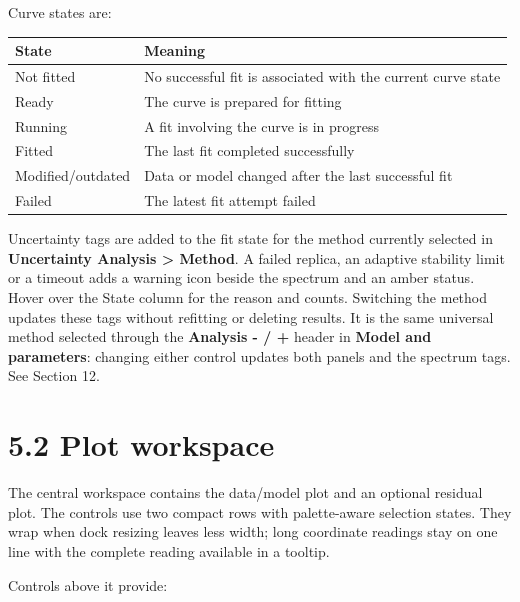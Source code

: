 \documentclass[
  10pt,
  a4paper,
  oneside]{scrreprt}
\begin{document}
Curve states are:

\begin{longtable}[]{@{}ll@{}}
\toprule
State & Meaning\tabularnewline
\midrule
\endhead
Not fitted & No successful fit is associated with the current curve
state\tabularnewline
Ready & The curve is prepared for fitting\tabularnewline
Running & A fit involving the curve is in progress\tabularnewline
Fitted & The last fit completed successfully\tabularnewline
Modified/outdated & Data or model changed after the last successful
fit\tabularnewline
Failed & The latest fit attempt failed\tabularnewline
\bottomrule
\end{longtable}

Uncertainty tags are added to the fit state for the method currently
selected in \textbf{Uncertainty Analysis \textgreater{} Method}. A
failed replica, an adaptive stability limit or a timeout adds a warning
icon beside the spectrum and an amber status. Hover over the State
column for the reason and counts. Switching the method updates these
tags without refitting or deleting results. It is the same universal
method selected through the \textbf{Analysis - / +} header in
\textbf{Model and parameters}: changing either control updates both
panels and the spectrum tags. See Section 12.

\hypertarget{plot-workspace}{%
\section{5.2 Plot workspace}\label{plot-workspace}}

The central workspace contains the data/model plot and an optional
residual plot. The controls use two compact rows with palette-aware
selection states. They wrap when dock resizing leaves less width; long
coordinate readings stay on one line with the complete reading available
in a tooltip.

Controls above it provide:
\end{document}
